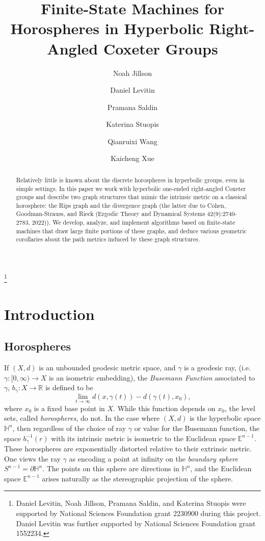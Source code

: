\documentclass{amsart}
\newcommand{\R}{\mathbb{R}}
\newcommand{\h}{\mathbb{H}}
\newcommand{\E}{\mathbb{E}}
\theoremstyle{definition}
\theoremstyle{remark}
\begin{document}
    
	\title{Finite-State Machines for Horospheres in Hyperbolic Right-Angled Coxeter Groups
	}

	\author{Noah Jillson \and Daniel Levitin \and Pramana Saldin \and Katerina Stuopis \and Qianruixi Wang \and Kaicheng Xue}

	
	\maketitle
	\thanks{Daniel Levitin, Noah Jillson, Pramana Saldin, and Katerina Stuopis were supported by National Sciences Foundation grant 2230900 during this project. Daniel Levitin was further supported by National Sciences Foundation grant 1552234.}
	
	\begin{abstract}
		Relatively little is known about the discrete horospheres in hyperbolic groups, even in simple settings. In this paper we work with hyperbolic one-ended right-angled Coxeter groups and describe two graph structures that mimic the intrinsic metric on a classical horosphere: the Rips graph and the divergence graph (the latter due to Cohen, Goodman-Strauss, and Rieck (Ergodic Theory and Dynamical Systems 42(9):2740-2783, 2022)). We develop, analyze, and implement algorithms based on finite-state machines that draw large finite portions of these graphs, and deduce various geometric corollaries about the path metrics induced by these graph structures.
	\end{abstract}
	
	\section{Introduction}
	\label{sec:intro}
	
	\subsection*{Horospheres}
    
    If $(X,d)$ is an unbounded geodesic metric space, and $\gamma$ is a geodesic ray, (i.e. $\gamma:[0,\infty)\to X$ is an isometric embedding), the \textit{Busemann Function} associated to $\gamma$, $b_\gamma:X\to \R$ is defined to be $$\lim_{t\to\infty} d(x, \gamma(t))-d(\gamma(t), x_0),$$ where $x_0$ is a fixed base point in $X$. While this function depends on $x_0$, the level sets, called  \textit{horospheres}, do not. In the case where $(X,d)$ is the hyperbolic space $\h^n$, then regardless of the choice of ray $\gamma$ or value for the Busemann function, the space $b_\gamma^{-1}(r)$ with its intrinsic metric is isometric to the Euclidean space $\E^{n-1}$. These horospheres are exponentially distorted relative to their extrinsic metric. One views the ray $\gamma$ as encoding a point at infinity on the \textit{boundary sphere} $S^{n-1}=\partial \h^n$. The points on this sphere are directions in $\h^n$, and the Euclidean space $\E^{n-1}$ arises naturally as the stereographic projection of the sphere.
	
\end{document}
